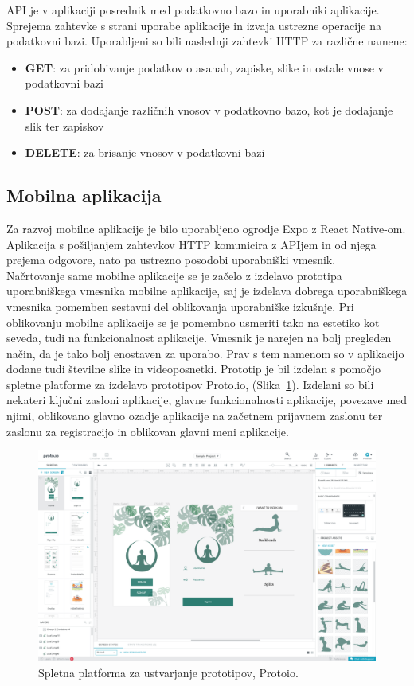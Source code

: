 \documentclass[a4paper, 12pt]{book}
\begin{document}
API je v aplikaciji posrednik med podatkovno bazo in uporabniki aplikacije. Sprejema zahtevke s strani uporabe aplikacije in izvaja ustrezne operacije na podatkovni bazi. Uporabljeni so bili naslednji zahtevki HTTP za različne namene:

 \begin{itemize}
  \item \textbf{GET}: za pridobivanje podatkov o asanah, zapiske, slike in ostale vnose v podatkovni bazi
  \item \textbf{POST}: za dodajanje različnih vnosov v podatkovno bazo, kot je dodajanje slik ter zapiskov
  \item \textbf{DELETE}: za brisanje vnosov v podatkovni bazi
\end{itemize}

\subsection{Mobilna aplikacija}
Za razvoj mobilne aplikacije je bilo uporabljeno ogrodje Expo z React Native-om. Aplikacija s pošiljanjem zahtevkov HTTP komunicira z APIjem in od njega prejema odgovore, nato pa ustrezno posodobi uporabniški vmesnik.\\

Načrtovanje same mobilne aplikacije se je začelo z izdelavo prototipa uporabniškega vmesnika mobilne aplikacije, saj je izdelava dobrega uporabniškega vmesnika pomemben sestavni del oblikovanja uporabniške izkušnje. Pri oblikovanju mobilne aplikacije se je pomembno usmeriti tako na estetiko kot seveda, tudi na funkcionalnost aplikacije. Vmesnik je narejen na bolj pregleden način, da je tako bolj enostaven za uporabo. Prav s tem namenom so v aplikacijo dodane tudi številne slike in videoposnetki.
Prototip je bil izdelan s pomočjo spletne platforme za izdelavo prototipov Proto.io, (Slika~\ref{protoio}). Izdelani so bili nekateri ključni zasloni aplikacije, glavne funkcionalnosti aplikacije, povezave med njimi, oblikovano glavno ozadje aplikacije na začetnem prijavnem zaslonu ter zaslonu za registracijo in oblikovan glavni meni aplikacije.

\begin{figure}[!htbp]
\begin{center}
\includegraphics[scale=.23]{protoio.png}
\end{center}
\caption{Spletna platforma za ustvarjanje prototipov, Protoio.}
\label{protoio}
\end{figure}
\end{document}
